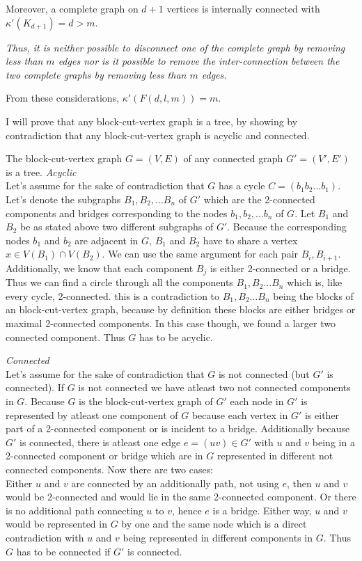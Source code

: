 \documentclass[a4paper]{article}
\begin{document}
\begin{solution}{14}
		Moreover, a complete graph on $d+1$ vertices is internally connected with $\kappa'(K_{d+1}) = d > m$.

		\emph{Thus, it is neither possible to disconnect one of the complete graph by removing less than $m$ edges nor is it possible to remove the inter-connection between the two complete graphs by removing less than $m$ edges.}

		From these considerations, $\kappa'(F(d,l,m)) = m$.
	\end{solution}
	\newpage
	\begin{solution}{15}
		I will prove that any block-cut-vertex graph is a tree, by showing by contradiction that any block-cut-vertex graph is acyclic and connected. 
	\begin{theorem}{The block-cut-vertex graph $G=(V,E)$ of any connected graph $G'=(V',E')$ is a tree.}
		\emph{Acyclic}\\
		Let's assume for the sake of contradiction that $G$ has a cycle $C=(b_1b_2...b_1)$.
		Let's denote the subgraphs $B_1,B_2,...B_n$ of $G'$ which are the 2-connected components and bridges corresponding to the nodes $b_1,b_2,...b_n$ of $G$. 
		Let $B_1$ and $B_2$ be as stated above two different subgraphs of $G'$. 
		Because the corresponding nodes $b_1$ and $b_2$ are adjacent in $G$, $B_1$ and $B_2$ have to share a vertex $x \in V(B_1) \cap V(B_2)$. 
		We can use the same argument for each pair $B_i, B_{i+1}$. 
		Additionally, we know that each component $B_j$ is either 2-connected or a bridge. 
		Thus we can find a circle through all the components $B_1, B_2...B_n$ which is, like every cycle, 2-connected.
		this is a contradiction to $B_1, B_2...B_n$ being the blocks of an block-cut-vertex graph, because by definition these blocks are either bridges or maximal 2-connected components. 
		In this case though, we found a larger two connected component. 
		Thus $G$ has to be acyclic. 
		
		\emph{Connected}\\
		Let's assume for the sake of contradiction that $G$ is not connected (but $G'$ is connected). 
		If $G$ is not connected we have atleast two not connected components in $G$. 
		Because $G$ is the block-cut-vertex graph of $G'$ each node in $G'$ is represented by atleast one component of $G$ because each vertex in $G'$ is either part of a 2-connected component or is incident to a bridge. 
		Additionally because $G'$ is connected, there is atleast one edge $e=(uv) \in G'$ with $u$ and $v$ being in a 2-connected component or bridge which are in $G$ represented in different not connected components. 
		Now there are two cases:\\
		Either $u$ and $v$ are connected by an additionally path, not using $e$, then $u$ and $v$ would be 2-connected and would lie in the same 2-connected component. 
		Or there is no additional path connecting $u$ to $v$, hence $e$ is a bridge. 
		Either way, $u$ and $v$ would be represented in $G$ by one and the same node which is a direct contradiction with $u$ and $v$ being represented in different components in $G$. 
		Thus $G$ has to be connected if $G'$ is connected.  
	\end{theorem}
	\end{solution}
	\newpage
	\begin{solution}{16}
	\end{solution}
	
\end{document}
